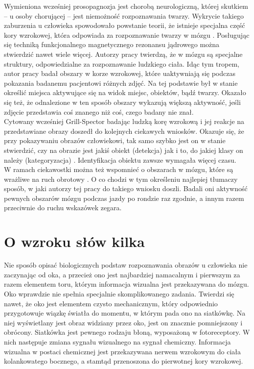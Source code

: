 Wymieniona wcześniej prosopagnozja jest chorobą neurologiczną, której skutkiem -- u osoby chorującej -- jest niemożność rozpoznawania twarzy. Wykrycie takiego zaburzenia u człowieka spowodowało powstanie teorii, że istnieje specjalna część kory wzrokowej, która odpowiada za rozpoznawanie twarzy w mózgu \cite{Gauthier1999}. Posługując się techniką funkcjonalnego magnetycznego rezonansu jądrowego można stwierdzić nawet wiele więcej. Autorzy pracy \cite{Downing2001} twierdzą, że w mózgu są specjalne struktury, odpowiedzialne za rozpoznawanie ludzkiego ciała. Idąc tym tropem, autor pracy \cite{Grill-Spector2003} badał obszary w korze wzrokowej, które uaktywniają się podczas pokazania badanemu pacjentowi różnych zdjęć. Na tej podstawie był w stanie określić miejsca aktywujące się na widok miejsc, obiektów, bądź twarzy. Okazało się też, że odnalezione w ten sposób obszary wykazują większą aktywność, jeśli zdjęcie przedstawia coś znanego niż coś, czego badany nie znał.\\
Cytowany wcześniej Grill-Spector badając ludzką korę wzrokową i jej reakcje na przedstawiane obrazy doszedł do kolejnych ciekawych wniosków. Okazuje się, że przy pokazywaniu obrazów człowiekowi, tak samo szybko jest on w stanie stwierdzić, czy na obrazie jest jakiś obiekt (detekcja) jak i to, do jakiej klasy on należy (kategoryzacja) \cite{Grill-Spector2005}. Identyfikacja obiektu zawsze wymagała więcej czasu.\\

W ramach ciekawostki można też wspomnieć o obszarach w mózgu, które są wrażliwe na ruch obrotowy \cite{kahana2010}. O co chodzi w tym określeniu najlepiej tłumaczy sposób, w jaki autorzy tej pracy do takiego wniosku doszli. Badali oni aktywność pewnych obszarów mózgu podczas jazdy po rondzie raz zgodnie, a innym razem przeciwnie do ruchu wskazówek zegara. 

\section{O wzroku słów kilka}
\label{oWzrokuSlowKilka}
Nie sposób opisać biologicznych podstaw rozpoznawania obrazów u człowieka nie zaczynając od oka, a przecież ono jest najbardziej namacalnym i pierwszym za razem elementem toru, którym informacja wizualna jest przekazywana do mózgu.\\

Oko wprawdzie nie spełnia specjalnie skomplikowanego zadania. Twierdzi się nawet, że oko jest elementem czysto mechanicznym, który odpowiednio przygotowuje wiązkę światła do momentu, w którym pada ono na siatkówkę. Na niej wyświetlany jest obraz widziany przez oko, jest on znacznie pomniejszony i obrócony. Siatkówka jest pewnego rodzaju błoną, wyposażoną w fotoreceptory. W nich następuje zmiana sygnału wizualnego na sygnał chemiczny. Informacja wizualna w postaci chemicznej jest przekazywana nerwem wzrokowym do ciała kolankowatego bocznego, a stamtąd przenoszona do pierwotnej kory wzrokowej.


